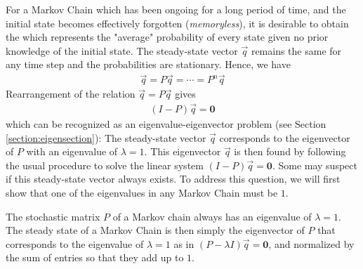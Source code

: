 For a Markov Chain which has been ongoing for a long period of time, and the initial state becomes effectively forgotten (\textit{memoryless}), it is desirable to obtain the  which represents the "average" probability of every state given no prior knowledge of the initial state. The steady-state vector $\vec{q}$ remains the same for any time step and the probabilities are stationary. Hence, we have 
\begin{align}
\label{eqn:qeqPq}
\vec{q} = P\vec{q} = \cdots = P^n\vec{q}    
\end{align}
Rearrangement of the relation $\vec{q} = P\vec{q}$ gives 
\begin{align}
(I-P)\vec{q} = \textbf{0}    
\end{align}
which can be recognized as an eigenvalue-eigenvector problem (see Section \ref{section:eigensection}): The steady-state vector $\vec{q}$ corresponds to the eigenvector of $P$ with an eigenvalue of $\lambda = 1$. This eigenvector $\vec{q}$ is then found by following the usual procedure to solve the linear system $(I-P)\vec{q} = \textbf{0}$. Some may suspect if this steady-state vector always exists. To address this question, we will first show that one of the eigenvalues in any Markov Chain must be $1$.
\begin{proper}
\label{proper:markoveigen1}
The stochastic matrix $P$ of a Markov chain always has an eigenvalue of $\lambda = 1$. The steady state of a Markov Chain is then simply the eigenvector of $P$ that corresponds to the eigenvalue of $\lambda = 1$ as in $(P - \lambda I)\vec{q} = \textbf{0}$, and normalized by the sum of entries so that they add up to $1$.
\end{proper}
